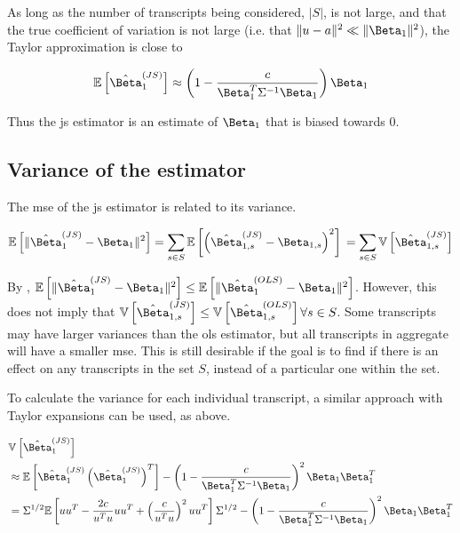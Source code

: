 As long as the number of transcripts being considered, $|S|$, is not large, and that the true coefficient of variation is not large (i.e. that $\Vert u - a \Vert ^2 \ll \Vert \Beta_1 \Vert ^2$), the Taylor approximation is close to

\begin{equation}
  \mathbb{E}\left[ \hat{\Beta}_1^{(JS)} \right] \approx \left(1 - \frac{c}{\Beta_1^T \Sigma^{-1} \Beta_1} \right) \Beta_1
\end{equation}

Thus the \gls{js} estimator is an estimate of $\Beta_1$ that is biased towards 0.

\subsection{Variance of the  estimator}

The \gls{mse} of the \gls{js} estimator is related to its variance.

\begin{equation*}
  \mathbb{E} \left[ \Vert \hat{\Beta}_1^{(JS)} - \Beta_1 \Vert ^2\right] 
  = \sum_{s \in S} \mathbb{E}\left[ \left( \hat{\Beta}_{1,s}^{(JS)} - \Beta_{1,s} \right)^2 \right] \\
  = \sum_{s \in S} \mathbb{V}\left[ \hat{\Beta}_{1,s}^{(JS)} \right]
\end{equation*}

By \cite[REF][]{bockMinimaxEstimatorsMean1975}, $\mathbb{E} \left[ \Vert \hat{\Beta}_1^{(JS)} - \Beta_1 \Vert ^2\right] \le \mathbb{E} \left[ \Vert \hat{\Beta}_1^{(OLS)} - \Beta_1 \Vert ^2\right]$.
However, this does not imply that $\mathbb{V} \left[ \hat{\Beta}_{1,s}^{(JS)} \right] \le \mathbb{V} \left[ \hat{\Beta}_{1,s}^{(OLS)} \right] \forall s \in S$.
Some transcripts may have larger variances than the \gls{ols} estimator, but all transcripts in aggregate will have a smaller \gls{mse}.
This is still desirable if the goal is to find if there is an effect on any transcripts in the set $S$, instead of a particular one within the set.

To calculate the variance for each individual transcript, a similar approach with Taylor expansions can be used, as above.

\begin{align*}
  &\mathbb{V} \left[ \hat{\Beta}_1^{(JS)} \right] \\
  &\approx \mathbb{E} \left[ \hat{\Beta}_1^{(JS)}
    \left( \hat{\Beta}_1^{(JS)} \right)^T \right]
    - \left(1 - \frac{c}{\Beta_1^T \Sigma^{-1} \Beta_1} \right)^2 \Beta_1 \Beta_1^T \\
  &= \Sigma^{1/2} \mathbb{E} \left[ u u^T - \frac{2c}{u^Tu}uu^T + \left( \frac{c}{u^Tu} \right)^2 uu^T \right]\Sigma^{1/2}
    - \left(1 - \frac{c}{\Beta_1^T \Sigma^{-1} \Beta_1} \right)^2 \Beta_1 \Beta_1^T \\
\end{align*}

